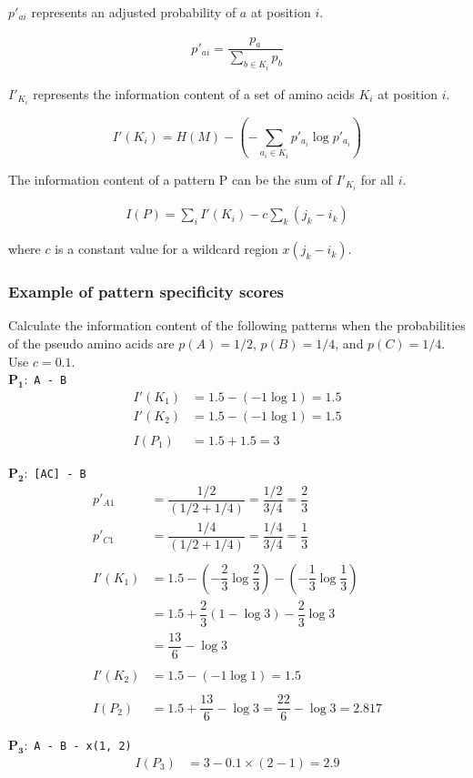 \noindent
$p\prime_{ai}$ represents an adjusted probability of $a$ at position $i$.

\begin{align*}
p'_{ai} = \dfrac{p_a}{\sum_{b \in K_i} p_b} 
\end{align*}

\noindent
$I'_{K_i}$ represents the information content of a set of amino acids $K_i$ at position $i$. 

\[
I'(K_i) = H(M) - \left (-\sum_{a_i \in K_i}  p'_{a_i} \log⁡ p'_{a_i} \right )	
\]

\noindent
The information content of a pattern P can be the sum of $I'_{K_i}$ for all $i$.

\begin{align*}
I(P)=\sum_{i} I'(K_i) - c \sum_{k} (j_k - i_k)	
\end{align*}

\begin{center}
where $c$ is a constant value for a wildcard region $x(j_k - i_k)$.
\end{center}

%
%
\subsubsection*{Example of pattern specificity scores}
Calculate the information content of the following patterns when the probabilities of the pseudo amino acids are $p(A)=1/2$, $p(B)=1/4$, and $p(C)=1/4$. Use $c = 0.1$. \\

$\mathbf{P_1:}$ \verb|A - B|
\begin{align*}
I'(K_1) &= 1.5 - (-1 \log⁡1) = 1.5 \\
I'(K_2) &= 1.5 - (-1 \log⁡1) = 1.5 \\ \\
I(P_1) &= 1.5 + 1.5 = 3
\end{align*}

$\mathbf{P_2:}$ \verb|[AC] - B|
\begin{align*}
p'_{A1} &= \dfrac{1/2}{(1/2+1/4)} = \dfrac{1/2}{3/4} = \dfrac{2}{3} \\
p'_{C1} &= \dfrac{1/4}{(1/2+1/4)} = \dfrac{1/4}{3/4} = \dfrac{1}{3} \\ \\
I'(K_1) &= 1.5 - \left (-\dfrac{2}{3} \log⁡ \dfrac{2}{3} \right) -  \left (-\dfrac{1}{3} \log⁡ \dfrac{1}{3} \right)  \\
 &= 1.5 + \dfrac{2}{3} ( 1 - \log⁡3) - \dfrac{2}{3}  \log⁡3 \\
 &=\dfrac{13}{6} - \log3 \\ \\
I'(K_2) &= 1.5 - (-1 \log⁡1) = 1.5 \\ \\
I(P_2) &= 1.5 + \dfrac{13}{6} - \log3 = \dfrac{22}{6} - \log3 = 2.817
\end{align*}

$\mathbf{P_3:}$ \verb|A - B - x(1, 2)|
\begin{align*}
I(P_3) &= 3 - 0.1 \times (2 - 1) = 2.9
\end{align*}

\bigskip 

%
